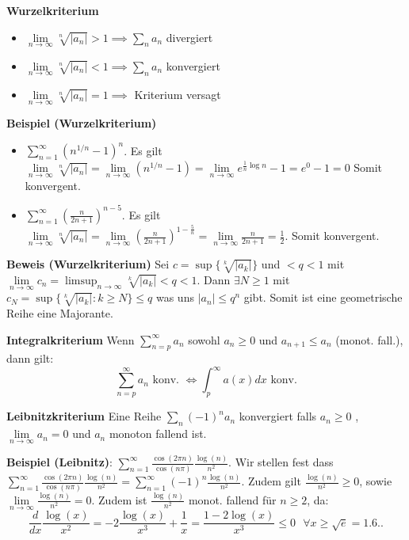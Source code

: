 \documentclass[25pt]{sciposter}
\newcommand{\limm}{\lim\limits_{n \to \infty}}
\newenvironment{method}[1]{\begin{mdframed}[backgroundcolor=blue!10,innertopmargin=15pt, innerbottommargin=15pt, nobreak=true]
		\textbf{#1 }
	}
	{ 
	\end{mdframed}
}
\begin{document}
\begin{multicols}{3}
\begin{method}{Wurzelkriterium}
	\begin{itemize}
		\item $\lim\limits_{n \to \infty} \sqrt[n]{|a_n|}>1 \implies \sum_{n} a_n $ divergiert
		\item $\lim\limits_{n \to \infty} \sqrt[n]{|a_n|}<1 \implies \sum_{n} a_n $ konvergiert
		\item $\lim\limits_{n \to \infty} \sqrt[n]{|a_n|}=1 \implies $ Kriterium versagt
	\end{itemize}
\end{method}

\textbf{Beispiel (Wurzelkriterium)}
\begin{itemize}
	\item $\sum_{n=1}^{\infty} \left( n^{1/n} -1 \right)^n $. Es gilt $\limm \sqrt[n]{|a_n|} = \limm (n^{1/n}-1) = \limm e^{\frac{1}{n}\log n} -1 = e^0-1 = 0$ Somit konvergent.
	
	\item $\sum_{n=1}^{\infty} \left(\frac{n}{2n+1}\right) ^{n-5}$. Es gilt $\limm \sqrt[n]{|a_n|} = \limm \left( \frac{n}{2n+1} \right)^{1-\frac{5}{n}} = \limm\frac{n}{2n+1} = \frac{1}{2}$. Somit konvergent.
\end{itemize}


\textbf{Beweis (Wurzelkriterium)}
Sei $c = \sup \{\sqrt[k]{|a_k|}\}$ und $ < q< 1$ mit $\limm c_n = \limsup_{n\to \infty} \sqrt[k]{|a_k|} < q <1$. Dann $\exists N \geq 1$ mit $ c_N = \sup\{ \sqrt[k]{|a_k|}: k\geq N \} \leq q$ was uns $|a_n| \leq q^n$ gibt. Somit ist eine geometrische Reihe eine Majorante.


\begin{method}{Integralkriterium} Wenn $\sum_{n=p}^{\infty} a_n$ sowohl $a_n \geq 0$ und $a_{n+1} \leq a_n$ (monot. fall.), dann gilt:
$$\sum_{n=p}^{\infty} a_n \text{ konv. } \iff \int_{p}^{\infty} a(x) dx \text{ konv.}$$
\end{method}


\begin{method}{Leibnitzkriterium} Eine Reihe $\sum_n (-1)^n a_n$ konvergiert falls $a_n \geq 0$ , $\lim\limits_{n \to \infty } a_n = 0$ und $a_n$ monoton fallend ist.
\end{method}

\textbf{Beispiel (Leibnitz)}: $\sum_{n = 1}^{\infty} \frac{\cos(2\pi n)}{\cos(n \pi)} \frac{\log(n)}{n^2}$. Wir stellen fest dass $\sum_{n = 1}^{\infty} \frac{\cos(2\pi n)}{\cos(n \pi)} \frac{\log(n)}{n^2} = \sum_{n = 1}^{\infty} (-1)^n \frac{\log(n)}{n^2}$. Zudem gilt $\frac{\log(n)}{n^2} \geq 0$, sowie $\lim\limits_{n \to \infty} \frac{\log(n)}{n^2} = 0$. Zudem ist $\frac{\log(n)}{n^2}$ monot. fallend für $n \geq 2$, da: 
$$ \frac{d}{dx} \frac{\log(x)}{x^2} = -2 \frac{\log(x)}{x^3} + \frac{1}{x} = \frac{1- 2\log(x)}{x^3} \leq 0\text{ } \forall x \geq \sqrt{e} = 1.6..$$






\end{multicols}
\end{document}
